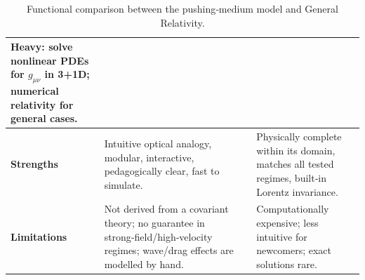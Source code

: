 \documentclass{article}
\begin{document}
\begin{table}[h!]
\begin{tabularx}{\textwidth}{|p{3cm}|X|X|}
Heavy: solve nonlinear PDEs for $g_{\mu\nu}$ in 3+1D; numerical relativity for general cases. \\
\hline
	\textbf{Strengths} &
Intuitive optical analogy, modular, interactive, pedagogically clear, fast to simulate. &
Physically complete within its domain, matches all tested regimes, built‑in Lorentz invariance. \\
\hline
	\textbf{Limitations} &
Not derived from a covariant theory; no guarantee in strong‑field/high‑velocity regimes; wave/drag effects are modelled by hand. &
Computationally expensive; less intuitive for newcomers; exact solutions rare. \\
\hline
\end{tabularx}
\caption{Functional comparison between the pushing‑medium model and General Relativity.}
\end{table}
\end{document}
